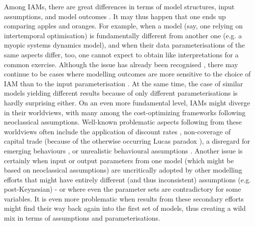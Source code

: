 \documentclass{article}
\begin{document}
\begin{refsection}
Among IAMs, there are great differences in terms of model structures, input assumptions, and model outcomes \parencite{krey_2014,krey_2019,hiroto_2020,keppo_2021}. It may thus happen that one ends up comparing apples and oranges. For example, when a model (say, one relying on intertemporal optimisation) is fundamentally different from another one (e.g. a myopic systems dynamics model), and when their data parameterisations of the same aspects differ, too, one cannot expect to obtain like interpretations for a common exercise.\footnotemark{} Although the issue has already been recognised \parencite{giarola_2021}, there may continue to be cases where modelling outcomes are more sensitive to the choice of IAM than to the input parameterisation \parencite{sognnaes_2021}. At the same time, the case of similar models yielding different results because of only different parameterisations is hardly surprising either. On an even more fundamental level, IAMs might diverge in their worldviews, with many among the cost-optimizing frameworks following neoclassical assumptions. Well-known problematic aspects following from these worldviews often include the application of discount rates \parencite{emmerling_2019}, non-coverage  of capital trade (because of the otherwise occurring Lucas paradox \parencite{lucas_1990,keppo_2021}), a disregard for emerging behaviours \parencite{farmer_2015}, or unrealistic behavioural assumptions \parencite{asefi_2021}. Another issue is certainly when input or output parameters from one model (which might be based on neoclassical assumptions) are uncritically adopted by other modelling efforts that might have entirely different (and thus inconsistent) assumptions (e.g. post-Keynesian) - or where even the parameter sets are contradictory for some variables. It is even more problematic when results from these secondary efforts might find their way back again into the first set of models, thus creating a wild mix in terms of assumptions and parameterisations.\footnotemark{}



\end{refsection}
\end{document}
